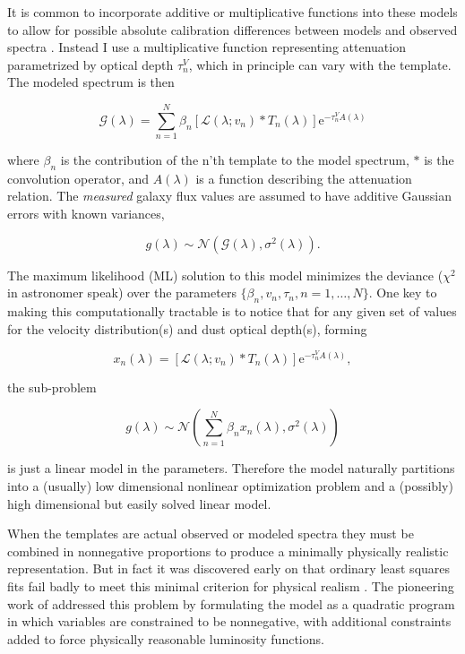 \documentclass[modern]{aastex62}
\begin{document}
It is common to incorporate additive or multiplicative functions into these models to allow for possible absolute calibration differences between models and observed spectra \citep[see for example][for a more general formulation]{2017MNRAS.466..798C}. Instead I use a multiplicative function representing attenuation parametrized by optical depth $\tau_n^V$, which in principle can vary with the template. The modeled spectrum is then

\begin{equation}
\label{eqn:modelsed}
\mathcal{G}(\lambda) = \sum_{n=1}^N \beta_n [\mathcal{L}(\lambda; v_n) \ast T_n(\lambda)]
            \mathrm{e}^{-\tau_n^V A(\lambda)}
\end{equation}

where $\beta_n$ is the contribution of the n'th template to the model spectrum, $\ast$ is the convolution operator, and $A(\lambda)$ is a function describing the attenuation relation. The \emph{measured} galaxy flux values are assumed to have additive Gaussian errors with known variances,

\begin{equation}
\label{eqn:like}
g(\lambda) \sim \mathcal{N}(\mathcal{G}(\lambda), \sigma^2(\lambda)).
\end{equation}

The maximum likelihood (ML) solution to this model minimizes the deviance ($\chi^2$ in astronomer speak) over the parameters $\{\beta_n, v_n, \tau_n, n=1, \ldots, N\}$. One key to making this computationally tractable is to notice that for any given set of values for the velocity distribution(s) and dust optical depth(s), forming

\begin{equation}
x_n(\lambda) = [\mathcal{L}(\lambda; v_n) \ast T_n(\lambda)]
\mathrm{e}^{-\tau_n^V A(\lambda)},
\end{equation}

the sub-problem

\begin{equation}
\label{eqn:linmodel}
g(\lambda) \sim \mathcal{N}(\sum_{n=1}^N \beta_n x_n(\lambda), \sigma^2(\lambda))
\end{equation}

is just a linear model in the parameters. Therefore the model naturally partitions into a (usually) low dimensional nonlinear optimization problem and a (possibly) high dimensional but easily solved linear model.

When the templates are actual observed or modeled spectra they must be combined in nonnegative proportions to produce a minimally physically realistic representation. But in fact it was discovered early on that ordinary least squares fits fail badly to meet this minimal criterion for physical realism \citep{1968AJ.....73..313M}. The pioneering work of \citet{1972A&A....20..361F} addressed this problem by formulating the model as a quadratic program in which variables are constrained to be nonnegative, with additional constraints added to force physically reasonable luminosity functions.
\end{document}
